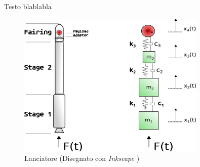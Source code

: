 \documentclass{article}
\begin{document}
        Testo blablabla

        \begin{figure}[h!]
            \centering
            \label{fig:esercitazione2_drawing}
            \includegraphics[width=0.8\textwidth]{MUL2/Esercitazione2/Esercitazione2.eps}
            \caption{Lanciatore (Disegnato con \textit{Inkscape} \autocite{Inkscape})}
        \end{figure}
        \clearpage
        \printbibliography
\end{document}
